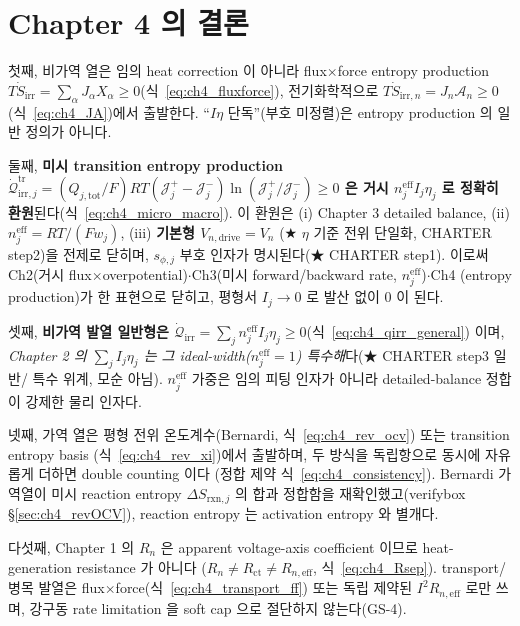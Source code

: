 \documentclass[11pt,a4paper]{article}
\newcommand{\eff}{\mathrm{eff}}
\newcommand{\drive}{\mathrm{drive}}
\newcommand{\tot}{\mathrm{tot}}
\newcommand{\irr}{\mathrm{irr}}
\newcommand{\rxn}{\mathrm{rxn}}
\newcommand{\ct}{\mathrm{ct}}
\newcommand{\tr}{\mathrm{tr}}
\begin{document}
\section{Chapter 4 의 결론}\label{sec:ch4_concl}
첫째, 비가역 열은 임의 heat correction 이 아니라 flux$\times$force entropy production $T\dot S_\irr=\sum_\alpha
J_\alpha X_\alpha\ge0$(식~\eqref{eq:ch4_fluxforce}), 전기화학적으로 $T\dot S_{\irr,n}=J_n\mathcal A_n\ge0$
(식~\eqref{eq:ch4_JA})에서 출발한다. ``$I\eta$ 단독''(부호 미정렬)은 entropy production 의 일반 정의가 아니다.

둘째, \textbf{미시 transition entropy production $\dot{\mathcal Q}_{\irr,j}^{\tr}=(Q_{j,\tot}/F)RT(\mathcal J_j^+-\mathcal J_j^-)
\ln(\mathcal J_j^+/\mathcal J_j^-)\ge0$ 은 거시 $n_j^{\eff}I_j\eta_j$ 로 정확히 환원}된다(식~\eqref{eq:ch4_micro_macro}).
이 환원은 (i) Chapter 3 detailed balance, (ii) $n_j^{\eff}=RT/(Fw_j)$, (iii) \textbf{기본형 $V_{n,\drive}=V_n$}
(★ $\eta$ 기준 전위 단일화, CHARTER step2)을 전제로 닫히며, $s_{\phi,j}$ 부호 인자가 명시된다(★ CHARTER step1).
이로써 Ch2(거시 flux$\times$overpotential)$\cdot$Ch3(미시 forward/backward rate, $n_j^{\eff}$)$\cdot$Ch4
(entropy production)가 한 표현으로 닫히고, 평형서 $I_j\to0$ 로 발산 없이 0 이 된다.

셋째, \textbf{비가역 발열 일반형은 $\dot{\mathcal Q}_\irr=\sum_j n_j^{\eff}I_j\eta_j\ge0$}(식~\eqref{eq:ch4_qirr_general})
이며, \emph{Chapter 2 의 $\sum_j I_j\eta_j$ 는 그 ideal-width($n_j^{\eff}=1$) 특수해}다(★ CHARTER step3 일반/
특수 위계, 모순 아님). $n_j^{\eff}$ 가중은 임의 피팅 인자가 아니라 detailed-balance 정합이 강제한 물리 인자다.

넷째, 가역 열은 평형 전위 온도계수(Bernardi, 식~\eqref{eq:ch4_rev_ocv}) 또는 transition entropy basis
(식~\eqref{eq:ch4_rev_xi})에서 출발하며, 두 방식을 독립항으로 동시에 자유롭게 더하면 double counting 이다
(정합 제약 식~\eqref{eq:ch4_consistency}). Bernardi 가역열이 미시 reaction entropy $\Delta S_{\rxn,j}$ 의 합과
정합함을 재확인했고(verifybox \S\ref{sec:ch4_revOCV}), reaction entropy 는 activation entropy 와 별개다.

다섯째, Chapter 1 의 $R_n$ 은 apparent voltage-axis coefficient 이므로 heat-generation resistance 가 아니다
($R_n\ne R_\ct\ne R_{n,\eff}$, 식~\eqref{eq:ch4_Rsep}). transport/병목 발열은 flux$\times$force(식~\eqref{eq:ch4_transport_ff})
또는 독립 제약된 $I^2R_{n,\eff}$ 로만 쓰며, 강구동 rate limitation 을 soft cap 으로 절단하지 않는다(GS-4).
\end{document}

